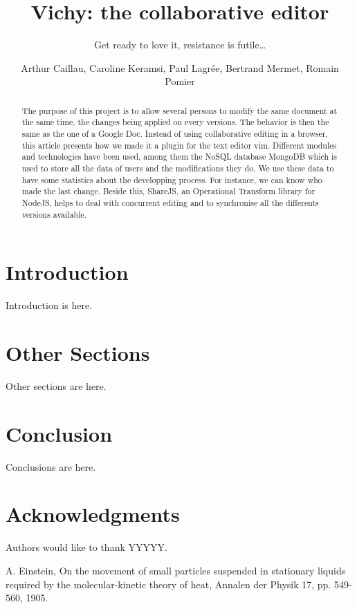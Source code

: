 \documentclass{llncs}
\begin{document}
\title{Vichy: the collaborative editor}
\subtitle{Get ready to love it, resistance is futile\ldots}

\author{Arthur Caillau, Caroline Keramsi, Paul Lagrée, Bertrand Mermet, Romain Pomier}

\maketitle

\begin{abstract}

The purpose of this project is to allow several persons to modify the same document at the same time, the changes being applied on every versions. The behavior is then the same as the one of a Google Doc. Instead of using collaborative editing in a browser, this article presents how we made it a plugin for the text editor vim. Different modules and technologies have been used, among them the NoSQL database MongoDB which is used to store all the data of users and the modifications they do. We use these data to have some statistics about the developping process. For instance, we can know who made the last change. Beside this, ShareJS, an Operational Transform library for NodeJS, helps to deal with concurrent editing and to synchronise all the differents versions available. 

\end{abstract}

\section{Introduction}\label{sec:Introduction}

Introduction is here.

\section{Other Sections}\label{sec:Others}

Other sections are here. 


\section{Conclusion}\label{sec:Conclusion}

Conclusions are here.

\section*{Acknowledgments}\label{sec:Acknowledgments}

Authors would like to thank YYYYY.

\begin{thebibliography}{1}

A. Einstein, On the movement of small particles suspended in stationary liquids required by the molecular-kinetic theory of heat, Annalen der Physik 17, pp. 549-560, 1905.

\end{thebibliography}
\end{document}
